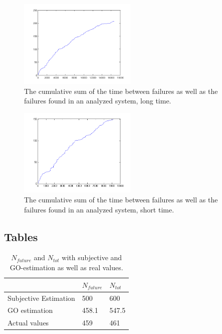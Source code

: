 \begin{figure}[htb!]
\begin{center}
	\includegraphics[width=0.5\textwidth]{cumsumjmdata2.png}
\caption{The cumulative sum of the time between failures as well as the failures found in an analyzed system, long time.}
\end{center}
\label{cumulativejmdata2}
\end{figure}


\begin{figure}[htb!]
\begin{center}
	\includegraphics[width=0.5\textwidth]{cumsumjmdata1plot.png}
\caption{The cumulative sum of the time between failures as well as the failures found in an analyzed system, short time.}
\end{center}
\label{cumulativejmdata1}
\end{figure}

\clearpage
\subsection*{Tables}

\begin{table}[!htb]
	\centering
	\caption{$N_{future}$ and $N_{tot}$ with subjective and GO-estimation as well as real values.}
	\label{goelokumototable}	
    \begin{tabular}{|l|l|l|}
        \hline
        ~ & $N_{future}$ & $N_{tot}$ \\ \hline
        Subjective Estimation            & 500   & 600 		\\ 
        GO estimation                    & 458.1 & 547.5	\\ 
        Actual values                    & 459 	 & 461		\\ 
        \hline
    \end{tabular}
\end{table}

